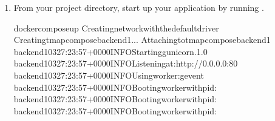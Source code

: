 \documentclass[letterpaper,10pt,english,openany,oneside]{sphinxmanual}
\begin{document}
\begin{enumerate}
\item {} 
\sphinxAtStartPar
From your project directory, start up your application by running .

\begin{sphinxVerbatim}[commandchars=\\\{\}]
\PYGZdl{}docker\PYGZhy{}composeup
Creatingnetworkwiththedefaultdriver
Creatingtmap\PYGZus{}compose\PYGZus{}backend\PYGZus{}1...
Attachingtotmap\PYGZus{}compose\PYGZus{}backend\PYGZus{}1
backend\PYGZus{}1\PYG{o}{[}\PYGZhy{}03\PYGZhy{}27:23:57+0000\PYG{o}{]}\PYG{o}{[}\PYG{o}{]}\PYG{o}{[}INFO\PYG{o}{]}Startinggunicorn.1.0
backend\PYGZus{}1\PYG{o}{[}\PYGZhy{}03\PYGZhy{}27:23:57+0000\PYG{o}{]}\PYG{o}{[}\PYG{o}{]}\PYG{o}{[}INFO\PYG{o}{]}Listeningat:http://0.0.0.0:80
backend\PYGZus{}1\PYG{o}{[}\PYGZhy{}03\PYGZhy{}27:23:57+0000\PYG{o}{]}\PYG{o}{[}\PYG{o}{]}\PYG{o}{[}INFO\PYG{o}{]}Usingworker:gevent
backend\PYGZus{}1\PYG{o}{[}\PYGZhy{}03\PYGZhy{}27:23:57+0000\PYG{o}{]}\PYG{o}{[}\PYG{o}{]}\PYG{o}{[}INFO\PYG{o}{]}Bootingworkerwithpid:
backend\PYGZus{}1\PYG{o}{[}\PYGZhy{}03\PYGZhy{}27:23:57+0000\PYG{o}{]}\PYG{o}{[}\PYG{o}{]}\PYG{o}{[}INFO\PYG{o}{]}Bootingworkerwithpid:
backend\PYGZus{}1\PYG{o}{[}\PYGZhy{}03\PYGZhy{}27:23:57+0000\PYG{o}{]}\PYG{o}{[}\PYG{o}{]}\PYG{o}{[}INFO\PYG{o}{]}Bootingworkerwithpid:

\end{sphinxVerbatim}
\end{enumerate}
\end{document}
